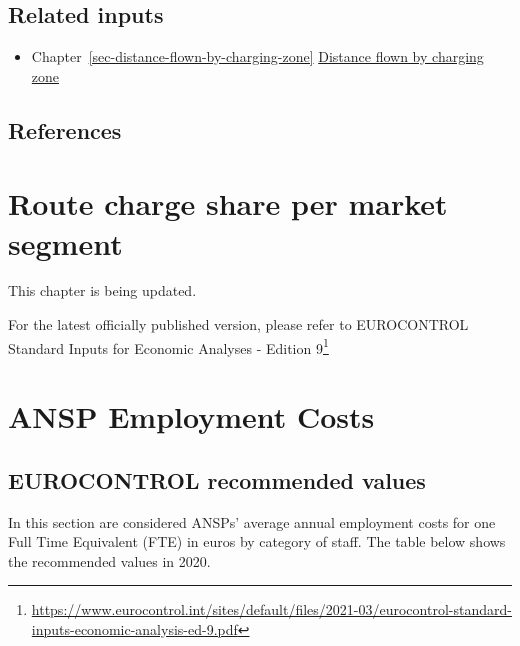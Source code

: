 \documentclass[
  11pt,
  a4paper,
]{book}
\providecommand{\tightlist}{%
  \setlength{\itemsep}{0pt}\setlength{\parskip}{0pt}}\usepackage{longtable,booktabs,array}
\DeclareRobustCommand{\href}[2]{#2\footnote{\url{#1}}}
\begin{document}
\hypertarget{related-inputs-12}{%
\section{Related inputs}\label{related-inputs-12}}

\begin{itemize}
\tightlist
\item
  Chapter~\ref{sec-distance-flown-by-charging-zone}
  \protect\hyperlink{sec-distance-flown-by-charging-zone}{Distance flown
  by charging zone}
\end{itemize}

\hypertarget{references-11}{%
\section{References}\label{references-11}}

\hypertarget{sec-route-charge-share-per-market-segment}{%
\chapter{Route charge share per market
segment}\label{sec-route-charge-share-per-market-segment}}

This chapter is being updated.

For the latest officially published version, please refer to
\href{https://www.eurocontrol.int/sites/default/files/2021-03/eurocontrol-standard-inputs-economic-analysis-ed-9.pdf}{EUROCONTROL
Standard Inputs for Economic Analyses - Edition 9}

\hypertarget{sec-ansp-employment-cost}{%
\chapter{ANSP Employment Costs}\label{sec-ansp-employment-cost}}

\hypertarget{eurocontrol-recommended-values-11}{%
\section{EUROCONTROL recommended
values}\label{eurocontrol-recommended-values-11}}

In this section are considered ANSPs' average annual employment costs
for one Full Time Equivalent (FTE) in euros by category of staff. The
table below shows the recommended values in 2020.
\end{document}
